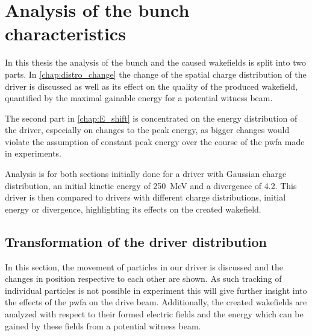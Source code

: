 \documentclass[bachelor_thesis]{subfiles}
\begin{document}
\chapter{Analysis of the bunch characteristics}
In this thesis the analysis of the bunch and the caused wakefields is split into two parts. In \autoref{chap:distro_change} the change of the spatial charge distribution of the driver is discussed as well as its effect on the quality of the produced wakefield, quantified by the maximal gainable energy for a potential witness beam.

The second part in \autoref{chap:E_shift} is concentrated on the energy distribution of the driver, especially on changes to the peak energy, as bigger changes would violate the assumption of constant peak energy over the course of the \gls{pwfa} made in experiments.

Analysis is for both sections initially done for a driver with Gaussian charge distribution, an initial kinetic energy of \qty{250}{\MeV} and a divergence of \qty{4.2}{\mrad}. This driver is then compared to drivers with different charge distributions, initial energy or divergence,
highlighting its effects on the created wakefield. 
 
\section{Transformation of the driver distribution} \label{chap:distro_change}
In this section, the movement of particles in our driver is discussed and the changes in position respective to each other are shown. As such tracking of individual particles is not possible in experiment
this will give further insight into the effects of the \gls{pwfa} on the drive beam. Additionally, the created wakefields are analyzed with respect to their formed electric fields and the energy which can be
gained by these fields from a potential witness beam. 
\end{document}
